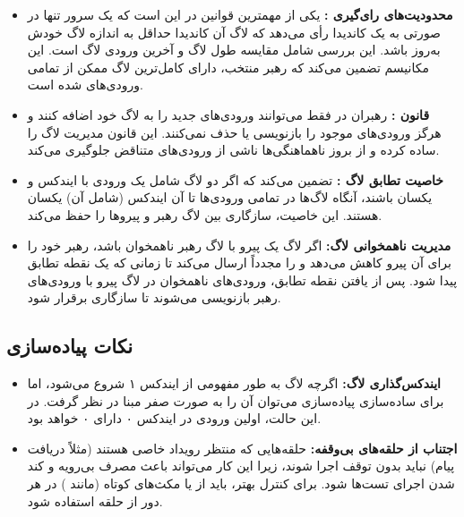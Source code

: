 \documentclass[12pt,a4paper]{article}
\begin{document}
\begin{itemize}
    \item \textbf{محدودیت‌های رای‌گیری :} یکی از مهمترین قوانین در  این است که یک سرور تنها در صورتی به یک کاندیدا رأی می‌دهد که لاگ آن کاندیدا حداقل به اندازه لاگ خودش به‌روز باشد. این بررسی شامل مقایسه طول لاگ و  آخرین ورودی لاگ است. این مکانیسم تضمین می‌کند که رهبر منتخب، دارای کامل‌ترین لاگ ممکن از تمامی ورودی‌های  شده است.
    \item \textbf{قانون :} رهبران در  فقط می‌توانند ورودی‌های جدید را به لاگ خود اضافه کنند و هرگز ورودی‌های موجود را بازنویسی یا حذف نمی‌کنند. این قانون مدیریت لاگ را ساده کرده و از بروز ناهماهنگی‌ها ناشی از ورودی‌های متناقض جلوگیری می‌کند.
    \item \textbf{خاصیت تطابق لاگ :}  تضمین می‌کند که اگر دو لاگ شامل یک ورودی با ایندکس و  یکسان باشند، آنگاه لاگ‌ها در تمامی ورودی‌ها تا آن ایندکس (شامل آن) یکسان هستند. این خاصیت، سازگاری بین لاگ رهبر و پیروها را حفظ می‌کند.
    \item \textbf{مدیریت ناهمخوانی لاگ:} اگر لاگ یک پیرو با لاگ رهبر ناهمخوان باشد، رهبر  خود را برای آن پیرو کاهش می‌دهد و  را مجدداً ارسال می‌کند تا زمانی که یک نقطه تطابق پیدا شود. پس از یافتن نقطه تطابق، ورودی‌های ناهمخوان در لاگ پیرو با ورودی‌های رهبر بازنویسی می‌شوند تا سازگاری برقرار شود.
\end{itemize}

\subsection{نکات پیاده‌سازی}

\begin{itemize}
    \item \textbf{ایندکس‌گذاری لاگ:} اگرچه لاگ  به طور مفهومی از ایندکس ۱ شروع می‌شود، اما برای ساده‌سازی پیاده‌سازی می‌توان آن را به صورت صفر مبنا در نظر گرفت. در این حالت، اولین ورودی در ایندکس ۰ دارای  ۰ خواهد بود.
    \item \textbf{اجتناب از حلقه‌های بی‌وقفه:} حلقه‌هایی که منتظر رویداد خاصی هستند (مثلاً دریافت پیام) نباید بدون توقف اجرا شوند، زیرا این کار می‌تواند باعث مصرف بی‌رویه  و کند شدن اجرای تست‌ها شود. برای کنترل بهتر، باید از  یا مکث‌های کوتاه (مانند ) در هر دور از حلقه استفاده شود.
\end{itemize}
\end{document}
